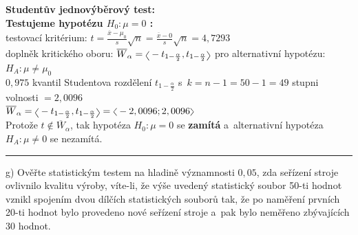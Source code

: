 \documentclass[a4paper, 11pt]{article}
\newcommand{\intlr}[1]{\scaleleftright[1ex]{<}{#1}{>}}
\begin{document}
	\textbf{Studentův jednovýběrový test:} \\
	\textbf{Testujeme hypotézu $ H_0 : \mu = 0 $ :} \\
	testovací kritérium: $ t = \frac{\overline{x} - \mu_0}{s} \sqrt{n} =
	\frac{\overline{x} - 0}{s} \sqrt{n} = 4,7293 $ \\
	doplněk kritického oboru: $ \overline{W}_\alpha = \intlr{-t_{1 -
	\frac{\alpha}{2}}, t_{1 - \frac{\alpha}{2}}} $ pro alternativní
	hypotézu: $ H_A : \mu \neq \mu_0 $ \\
	$ 0,975 $ kvantil Studentova rozdělení $ t_{1 - \frac{\alpha}{2}} $
	s~$ k = n - 1 = 50 - 1 = 49 $ stupni volnosti $ = 2,0096 $ \\
	$ \overline{W}_\alpha = \intlr{-t_{1 - \frac{\alpha}{2}}, t_{1 -
	\frac{\alpha}{2}}} = \intlr{-2,0096; 2,0096} $ \\
	Protože $ t \notin \overline{W}_\alpha $, tak hypotéza $ H_0 : \mu = 0 $
	se \textbf{zamítá} a~alternativní hypotéza $ H_A : \mu \neq 0 $ se
	nezamítá.

	\vspace{1em}\noindent\rule{\textwidth}{.5pt}\vspace{1em}

	g) Ověřte statistickým testem na hladině významnosti $ 0,05 $, zda
	seřízení stroje ovlivnilo kvalitu výroby, víte-li, že výše uvedený
	statistický soubor 50-ti hodnot vznikl spojením dvou dílčích
	statistických souborů tak, že po naměření prvních 20-ti hodnot bylo
	provedeno nové seřízení stroje a~pak bylo neměřeno zbývajících 30
	hodnot.
	\vspace{1em}
\end{document}
